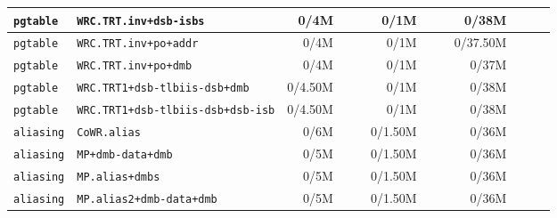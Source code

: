 \begin{tabular}{l l  | r r l | r r l | r r l l}
        \verb|pgtable| &                                 \verb|WRC.TRT.inv+dsb-isbs| &           0/4M &                       &                   &           0/1M &                       &                   &          0/38M &                       &                    & \\ \hline 
        \verb|pgtable| &                                  \verb|WRC.TRT.inv+po+addr| &           0/4M &                       &                   &           0/1M &                       &                   &       0/37.50M &                       &                    & \\ \hline 
        \verb|pgtable| &                                   \verb|WRC.TRT.inv+po+dmb| &           0/4M &                       &                   &           0/1M &                       &                   &          0/37M &                       &                    & \\ \hline 
        \verb|pgtable| &                          \verb|WRC.TRT1+dsb-tlbiis-dsb+dmb| &        0/4.50M &                       &                   &           0/1M &                       &                   &          0/38M &                       &                    & \\ \hline 
        \verb|pgtable| &                      \verb|WRC.TRT1+dsb-tlbiis-dsb+dsb-isb| &        0/4.50M &                       &                   &           0/1M &                       &                   &          0/38M &                       &                    & \\ \hline 
       \verb|aliasing| &                                           \verb|CoWR.alias| &           0/6M &                       &                   &        0/1.50M &                       &                   &          0/36M &                       &                    & \\ \hline 
       \verb|aliasing| &                                      \verb|MP+dmb-data+dmb| &           0/5M &                       &                   &        0/1.50M &                       &                   &          0/36M &                       &                    & \\ \hline 
       \verb|aliasing| &                                        \verb|MP.alias+dmbs| &           0/5M &                       &                   &        0/1.50M &                       &                   &          0/36M &                       &                    & \\ \hline 
       \verb|aliasing| &                               \verb|MP.alias2+dmb-data+dmb| &           0/5M &                       &                   &        0/1.50M &                       &                   &          0/36M &                       &                    & \\ \hline 

\end{tabular}
